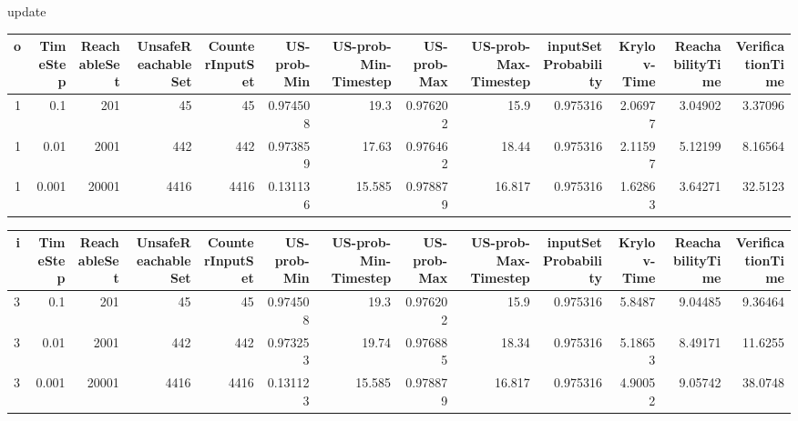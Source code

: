 update
\begin{tabular}{rrrrrrrrrrrrr}
\hline
   o &   TimeStep &   ReachableSet &   UnsafeReachableSet &   CounterInputSet &   US-prob-Min &   US-prob-Min-Timestep &   US-prob-Max &   US-prob-Max-Timestep &   inputSet Probability &   Krylov-Time &   ReachabilityTime &   VerificationTime \\
\hline
   1 &      0.1   &            201 &                   45 &                45 &      0.974508 &                 19.3   &      0.976202 &                 15.9   &               0.975316 &       2.06977 &            3.04902 &            3.37096 \\
   1 &      0.01  &           2001 &                  442 &               442 &      0.973859 &                 17.63  &      0.976462 &                 18.44  &               0.975316 &       2.11597 &            5.12199 &            8.16564 \\
   1 &      0.001 &          20001 &                 4416 &              4416 &      0.131136 &                 15.585 &      0.978879 &                 16.817 &               0.975316 &       1.62863 &            3.64271 &           32.5123  \\
\hline
\end{tabular}
\begin{tabular}{rrrrrrrrrrrrr}
\hline
   i &   TimeStep &   ReachableSet &   UnsafeReachableSet &   CounterInputSet &   US-prob-Min &   US-prob-Min-Timestep &   US-prob-Max &   US-prob-Max-Timestep &   inputSet Probability &   Krylov-Time &   ReachabilityTime &   VerificationTime \\
\hline
   3 &      0.1   &            201 &                   45 &                45 &      0.974508 &                 19.3   &      0.976202 &                 15.9   &               0.975316 &       5.8487  &            9.04485 &            9.36464 \\
   3 &      0.01  &           2001 &                  442 &               442 &      0.973253 &                 19.74  &      0.976885 &                 18.34  &               0.975316 &       5.18653 &            8.49171 &           11.6255  \\
   3 &      0.001 &          20001 &                 4416 &              4416 &      0.131123 &                 15.585 &      0.978879 &                 16.817 &               0.975316 &       4.90052 &            9.05742 &           38.0748  \\
\hline
\end{tabular}

